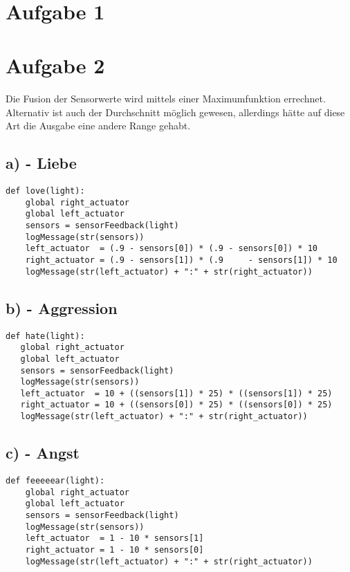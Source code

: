 \documentclass{./Vorlage/mat}
\begin{document}
 \\

\section*{Aufgabe 1}

\section*{Aufgabe 2}
Die Fusion der Sensorwerte wird mittels einer Maximumfunktion errechnet. Alternativ ist auch der Durchschnitt möglich gewesen, allerdings hätte auf diese Art die Ausgabe eine andere Range gehabt.
\subsection*{a) - Liebe}
\begin{lstlisting}
def love(light):
    global right_actuator
    global left_actuator
    sensors = sensorFeedback(light)
    logMessage(str(sensors))
    left_actuator  = (.9 - sensors[0]) * (.9 - sensors[0]) * 10
    right_actuator = (.9 - sensors[1]) * (.9     - sensors[1]) * 10
    logMessage(str(left_actuator) + ":" + str(right_actuator))
\end{lstlisting}

\subsection*{b) - Aggression}
\begin{lstlisting}
def hate(light):
   global right_actuator
   global left_actuator
   sensors = sensorFeedback(light)
   logMessage(str(sensors))
   left_actuator  = 10 + ((sensors[1]) * 25) * ((sensors[1]) * 25)
   right_actuator = 10 + ((sensors[0]) * 25) * ((sensors[0]) * 25)
   logMessage(str(left_actuator) + ":" + str(right_actuator))
\end{lstlisting}

\subsection*{c) - Angst}
\begin{lstlisting}
def feeeeear(light):
    global right_actuator
    global left_actuator
    sensors = sensorFeedback(light)
    logMessage(str(sensors))
    left_actuator  = 1 - 10 * sensors[1]
    right_actuator = 1 - 10 * sensors[0]
    logMessage(str(left_actuator) + ":" + str(right_actuator))  
\end{lstlisting}
\end{document}
